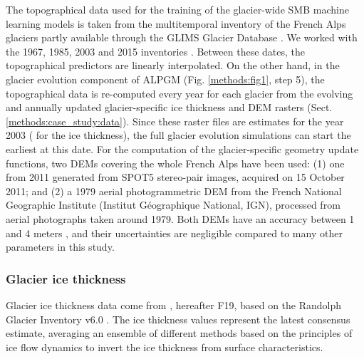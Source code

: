 The topographical data used for the training of the glacier-wide SMB machine learning models is taken from the multitemporal inventory of the French Alps glaciers \citep[e.g.,][]{gardent_multitemporal_2014} partly available through the GLIMS Glacier Database \citep{glims_and_nsidc_global_2005}. We worked with the 1967, 1985, 2003 and 2015 inventories \citep[with 2015 update]{gardent_multitemporal_2014}. Between these dates, the topographical predictors are linearly interpolated. On the other hand, in the glacier evolution component of ALPGM (Fig. \ref{methods:fig1}, step 5), the topographical data is re-computed every year for each glacier from the evolving and annually updated glacier-specific ice thickness and DEM rasters (Sect. \ref{methods:case_study:data}). Since these raster files are estimates for the year 2003 (\citet{farinotti_consensus_2019} for the ice thickness), the full glacier evolution simulations can start the earliest at this date. For the computation of the glacier-specific geometry update functions, two DEMs covering the whole French Alps have been used: (1) one from 2011 generated from SPOT5 stereo-pair images, acquired on 15 October 2011; and (2) a 1979 aerial photogrammetric DEM from the French National Geographic Institute (Institut Géographique National, IGN), processed from aerial photographs taken around 1979. Both DEMs have an accuracy between 1 and 4 meters \citep{rabatel_spatio-temporal_2016}, and their uncertainties are negligible compared to many other parameters in this study. 

\subsubsection{Glacier ice thickness} 

Glacier ice thickness data come from \citet{farinotti_consensus_2019}, hereafter F19, based on the Randolph Glacier Inventory v6.0 \citep[RGI,][]{consortium_randolph_2017}. The ice thickness values represent the latest consensus estimate, averaging an ensemble of different methods based on the principles of ice flow dynamics to invert the ice thickness from surface characteristics.

